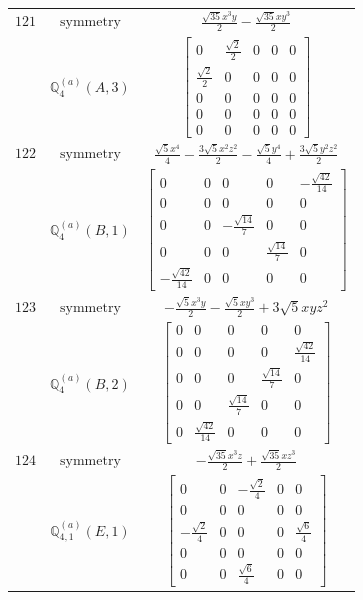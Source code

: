 \documentclass[fleqn,8pt,landscape]{jsarticle}
\begin{document}
\begin{longtable}{ccc}
$ 121 $ & $ \text{symmetry} $ & $ \frac{\sqrt{35} x^{3} y}{2} - \frac{\sqrt{35} x y^{3}}{2} $ \\
$  $ & $ \mathbb{Q}_{4}^{(a)}(A,3) $ & $ \begin{bmatrix} 0 & \frac{\sqrt{2}}{2} & 0 & 0 & 0 \\ \frac{\sqrt{2}}{2} & 0 & 0 & 0 & 0 \\ 0 & 0 & 0 & 0 & 0 \\ 0 & 0 & 0 & 0 & 0 \\ 0 & 0 & 0 & 0 & 0 \end{bmatrix} $ \\ \hline
$ 122 $ & $ \text{symmetry} $ & $ \frac{\sqrt{5} x^{4}}{4} - \frac{3 \sqrt{5} x^{2} z^{2}}{2} - \frac{\sqrt{5} y^{4}}{4} + \frac{3 \sqrt{5} y^{2} z^{2}}{2} $ \\
$  $ & $ \mathbb{Q}_{4}^{(a)}(B,1) $ & $ \begin{bmatrix} 0 & 0 & 0 & 0 & - \frac{\sqrt{42}}{14} \\ 0 & 0 & 0 & 0 & 0 \\ 0 & 0 & - \frac{\sqrt{14}}{7} & 0 & 0 \\ 0 & 0 & 0 & \frac{\sqrt{14}}{7} & 0 \\ - \frac{\sqrt{42}}{14} & 0 & 0 & 0 & 0 \end{bmatrix} $ \\ \hline
$ 123 $ & $ \text{symmetry} $ & $ - \frac{\sqrt{5} x^{3} y}{2} - \frac{\sqrt{5} x y^{3}}{2} + 3 \sqrt{5} x y z^{2} $ \\
$  $ & $ \mathbb{Q}_{4}^{(a)}(B,2) $ & $ \begin{bmatrix} 0 & 0 & 0 & 0 & 0 \\ 0 & 0 & 0 & 0 & \frac{\sqrt{42}}{14} \\ 0 & 0 & 0 & \frac{\sqrt{14}}{7} & 0 \\ 0 & 0 & \frac{\sqrt{14}}{7} & 0 & 0 \\ 0 & \frac{\sqrt{42}}{14} & 0 & 0 & 0 \end{bmatrix} $ \\ \hline
$ 124 $ & $ \text{symmetry} $ & $ - \frac{\sqrt{35} x^{3} z}{2} + \frac{\sqrt{35} x z^{3}}{2} $ \\
$  $ & $ \mathbb{Q}_{4,1}^{(a)}(E,1) $ & $ \begin{bmatrix} 0 & 0 & - \frac{\sqrt{2}}{4} & 0 & 0 \\ 0 & 0 & 0 & 0 & 0 \\ - \frac{\sqrt{2}}{4} & 0 & 0 & 0 & \frac{\sqrt{6}}{4} \\ 0 & 0 & 0 & 0 & 0 \\ 0 & 0 & \frac{\sqrt{6}}{4} & 0 & 0 \end{bmatrix} $ \\ \hline

\end{longtable}
\end{document}
